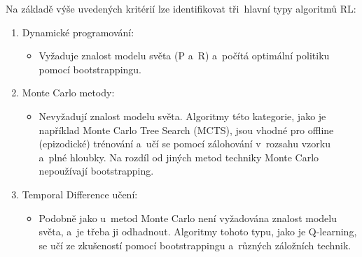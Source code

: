 Na základě výše uvedených kritérií lze identifikovat tři~hlavní typy algoritmů RL:
\begin{enumerate}
	\item Dynamické programování:
	\begin{itemize}
		\item Vyžaduje znalost modelu světa (P a~R) a~počítá optimální politiku pomocí bootstrappingu. 
	\end{itemize} 
	\item Monte Carlo metody:
	\begin{itemize}
		\item Nevyžadují znalost modelu světa. Algoritmy této kategorie, jako je například Monte Carlo Tree Search (MCTS), jsou vhodné pro offline (epizodické) trénování a~učí se pomocí zálohování v~rozsahu vzorku a~plné hloubky. Na rozdíl od jiných metod techniky Monte Carlo nepoužívají bootstrapping.
	\end{itemize}
	\item Temporal Difference učení:
	\begin{itemize}
		\item Podobně jako u~metod Monte Carlo není vyžadována znalost modelu světa, a~je třeba ji odhadnout. Algoritmy tohoto typu, jako je Q-learning, se učí ze zkušeností pomocí bootstrappingu a~různých záložních technik.
	\end{itemize}
\end{enumerate}
